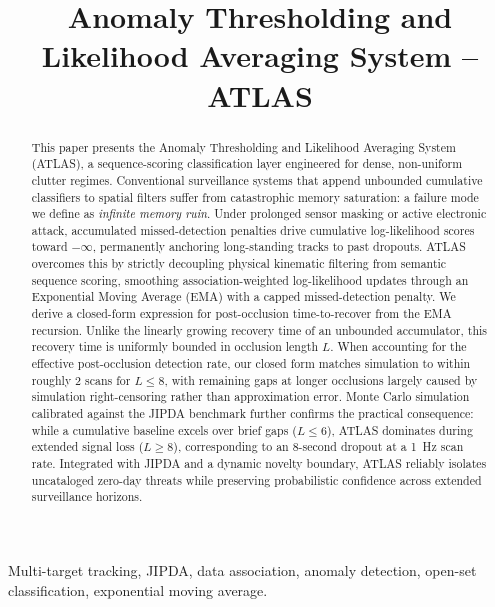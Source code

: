 \documentclass[conference]{IEEEtran}
\title{Anomaly Thresholding and Likelihood Averaging System -- ATLAS}
\author{\IEEEauthorblockN{Vasantha Eswar}
\IEEEauthorblockA{University of Michigan - Ann Arbor \\ \texttt{veswar@umich.edu} }}
\begin{document}
\maketitle

\begin{abstract}
This paper presents the Anomaly Thresholding and Likelihood Averaging System (ATLAS), a sequence-scoring classification layer engineered for dense, non-uniform clutter regimes. Conventional surveillance systems that append unbounded cumulative classifiers to spatial filters suffer from catastrophic memory saturation: a failure mode we define as \textit{infinite memory ruin}. Under prolonged sensor masking or active electronic attack, accumulated missed-detection penalties drive cumulative log-likelihood scores toward $-\infty$, permanently anchoring long-standing tracks to past dropouts. ATLAS overcomes this by strictly decoupling physical kinematic filtering from semantic sequence scoring, smoothing association-weighted log-likelihood updates through an Exponential Moving Average (EMA) with a capped missed-detection penalty. We derive a closed-form expression for post-occlusion time-to-recover from the EMA recursion. Unlike the linearly growing recovery time of an unbounded accumulator, this recovery time is uniformly bounded in occlusion length $L$. When accounting for the effective post-occlusion detection rate, our closed form matches simulation to within roughly 2 scans for $L \le 8$, with remaining gaps at longer occlusions largely caused by simulation right-censoring rather than approximation error. Monte Carlo simulation calibrated against the JIPDA benchmark further confirms the practical consequence: while a cumulative baseline excels over brief gaps ($L \leq 6$), ATLAS dominates during extended signal loss ($L \ge 8$), corresponding to an 8-second dropout at a 1~Hz scan rate. Integrated with JIPDA and a dynamic novelty boundary, ATLAS reliably isolates uncataloged zero-day threats while preserving probabilistic confidence across extended surveillance horizons.
\end{abstract}

\begin{IEEEkeywords}
Multi-target tracking, JIPDA, data association, anomaly detection, open-set classification, exponential moving average.
\end{IEEEkeywords}
\end{document}
